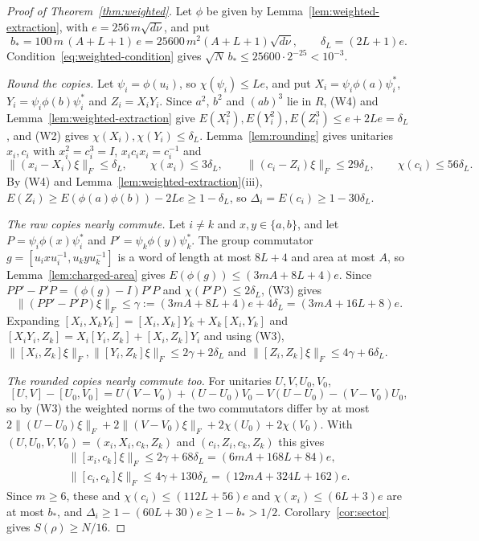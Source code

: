 \begin{proof}[Proof of Theorem~\ref{thm:weighted}]
Let $\phi$ be given by Lemma~\ref{lem:weighted-extraction}, with $e=256\,m\sqrt{d\nu}$, and put
\[
b_*=100\,m\,(A+L+1)\,e=25600\,m^2(A+L+1)\sqrt{d\nu},\qquad\delta_L=(2L+1)e .
\]
Condition~\eqref{eq:weighted-condition} gives $\sqrt N\,b_*\le25600\cdot2^{-25}<10^{-3}$.

\emph{Round the copies.} Let $\psi_i=\phi(u_i)$, so $\chi(\psi_i)\le Le$, and put $X_i=\psi_i\phi(a)\psi_i^*$, $Y_i=\psi_i\phi(b)\psi_i^*$ and $Z_i=X_iY_i$. Since
$a^2$, $b^2$ and $(ab)^3$ lie in $R$, (W4) and Lemma~\ref{lem:weighted-extraction} give $E(X_i^2),E(Y_i^2),E(Z_i^3)\le e+2Le=\delta_L$, and (W2) gives
$\chi(X_i),\chi(Y_i)\le\delta_L$. Lemma~\ref{lem:rounding} gives unitaries $x_i,c_i$ with $x_i^2=c_i^3=I$, $x_ic_ix_i=c_i^{-1}$ and
\[
\|(x_i-X_i)\xi\|_F\le\delta_L,\qquad\chi(x_i)\le3\delta_L,\qquad\|(c_i-Z_i)\xi\|_F\le29\delta_L,\qquad\chi(c_i)\le56\delta_L .
\]
By (W4) and Lemma~\ref{lem:weighted-extraction}(iii), $E(Z_i)\ge E(\phi(a)\phi(b))-2Le\ge1-\delta_L$, so $\Delta_i=E(c_i)\ge1-30\delta_L$.

\emph{The raw copies nearly commute.} Let $i\ne k$ and $x,y\in\{a,b\}$, and let $P=\psi_i\phi(x)\psi_i^*$ and $P'=\psi_k\phi(y)\psi_k^*$. The group commutator
$g=[u_ixu_i^{-1},u_kyu_k^{-1}]$ is a word of length at most $8L+4$ and area at most $A$, so Lemma~\ref{lem:charged-area} gives
$E(\phi(g))\le(3mA+8L+4)e$. Since $PP'-P'P=(\phi(g)-I)P'P$ and $\chi(P'P)\le2\delta_L$, (W3) gives
\[
\|(PP'-P'P)\xi\|_F\le\gamma:=(3mA+8L+4)e+4\delta_L=(3mA+16L+8)e .
\]
Expanding $[X_i,X_kY_k]=[X_i,X_k]Y_k+X_k[X_i,Y_k]$ and $[X_iY_i,Z_k]=X_i[Y_i,Z_k]+[X_i,Z_k]Y_i$ and using (W3),
$\|[X_i,Z_k]\xi\|_F,\|[Y_i,Z_k]\xi\|_F\le2\gamma+2\delta_L$ and $\|[Z_i,Z_k]\xi\|_F\le4\gamma+6\delta_L$.

\emph{The rounded copies nearly commute too.} For unitaries $U,V,U_0,V_0$,
\[
[U,V]-[U_0,V_0]=U(V-V_0)+(U-U_0)V_0-V(U-U_0)-(V-V_0)U_0,
\]
so by (W3) the weighted norms of the two commutators differ by at most
$2\|(U-U_0)\xi\|_F+2\|(V-V_0)\xi\|_F+2\chi(U_0)+2\chi(V_0)$. With $(U,U_0,V,V_0)=(x_i,X_i,c_k,Z_k)$ and $(c_i,Z_i,c_k,Z_k)$ this gives
\begin{gather*}
\|[x_i,c_k]\xi\|_F\le2\gamma+68\delta_L=(6mA+168L+84)e,\\
\|[c_i,c_k]\xi\|_F\le4\gamma+130\delta_L=(12mA+324L+162)e .
\end{gather*}
Since $m\ge6$, these and $\chi(c_i)\le(112L+56)e$ and $\chi(x_i)\le(6L+3)e$ are at most $b_*$, and $\Delta_i\ge1-(60L+30)e\ge1-b_*>1/2$.
Corollary~\ref{cor:sector} gives $S(\rho)\ge N/16$.
\end{proof}


